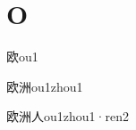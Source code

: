 \section*{O}

\begin{verbete*}[8]{欧}{ou1}
\end{verbete*}

\begin{verbete*}[8;9]{欧洲}{ou1zhou1}
\end{verbete*}

\begin{verbete}[8;9;2]{欧洲人}{ou1zhou1·ren2}
\end{verbete}



